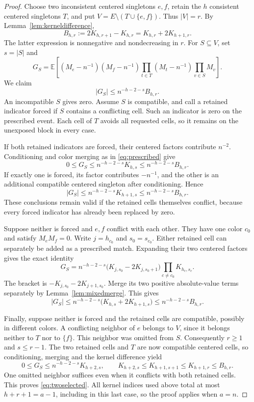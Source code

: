 \documentclass[11pt]{article}
\theoremstyle{definition}
\theoremstyle{remark}
\newcommand{\E}{\mathbb E}
\newcommand{\1}{\mathbf 1}
\begin{document}
\begin{proof}
Choose two inconsistent centered singletons $e,f$, retain the $h$ consistent centered singletons $T$, and put $V=E\setminus(T\cup\{e,f\})$. Thus $|V|=r$. By Lemma~\ref{lem:kerneldifference},
\[
B_{h,r}:=2K_{h,r+1}-K_{h,r}
=K_{h,r}+2K_{h+1,r}.
\]
The latter expression is nonnegative and nondecreasing in $r$. For $S\subseteq V$, set $s=|S|$ and
\[
G_S=\E\left[(M_e-n^{-1})(M_f-n^{-1})
\prod_{t\in T}(M_t-n^{-1})\prod_{v\in S}M_v\right].
\]
We claim
\begin{equation}\label{eq:twoselected}
|G_S|\le n^{-h-2-s}B_{h,r}.
\end{equation}
An incompatible $S$ gives zero. Assume $S$ is compatible, and call a retained indicator forced if $S$ contains a conflicting cell. Such an indicator is zero on the prescribed event. Each cell of $T$ avoids all requested cells, so it remains on the unexposed block in every case.

If both retained indicators are forced, their centered factors contribute $n^{-2}$. Conditioning and color merging as in \eqref{eq:prescribed} give
\[
0\le G_S\le n^{-h-2-s}K_{h,s}
\le n^{-h-2-s}B_{h,r}.
\]
If exactly one is forced, its factor contributes $-n^{-1}$, and the other is an additional compatible centered singleton after conditioning. Hence
\[
|G_S|\le n^{-h-2-s}K_{h+1,s}
\le n^{-h-2-s}B_{h,r}.
\]
These conclusions remain valid if the retained cells themselves conflict, because every forced indicator has already been replaced by zero.

Suppose neither is forced and $e,f$ conflict with each other. They have one color $c_0$ and satisfy $M_eM_f=0$. Write $j=h_{c_0}$ and $s_0=s_{c_0}$. Either retained cell can separately be added as a prescribed match. Expanding their two centered factors gives the exact identity
\[
G_S=n^{-h-2-s}
\bigl(K_{j,s_0}-2K_{j,s_0+1}\bigr)
\prod_{c\ne c_0}K_{h_c,s_c}.
\]
The bracket is $-K_{j,s_0}-2K_{j+1,s_0}$. Merge its two positive absolute-value terms separately by Lemma~\ref{lem:mixedmerge}. This gives
\[
|G_S|\le n^{-h-2-s}
\bigl(K_{h,s}+2K_{h+1,s}\bigr)
\le n^{-h-2-s}B_{h,r}.
\]

Finally, suppose neither is forced and the retained cells are compatible, possibly in different colors. A conflicting neighbor of $e$ belongs to $V$, since it belongs neither to $T$ nor to $\{f\}$. This neighbor was omitted from $S$. Consequently $r\ge1$ and $s\le r-1$. The two retained cells and $T$ are now compatible centered cells, so conditioning, merging and the kernel difference yield
\[
0\le G_S\le n^{-h-2-s}K_{h+2,s},
\qquad
K_{h+2,s}\le K_{h+1,s+1}\le K_{h+1,r}\le B_{h,r}.
\]
One omitted neighbor suffices even when it conflicts with both retained cells. This proves \eqref{eq:twoselected}. All kernel indices used above total at most $h+r+1=a-1$, including in this last case, so the proof applies when $a=n$.


\end{proof}
\end{document}
